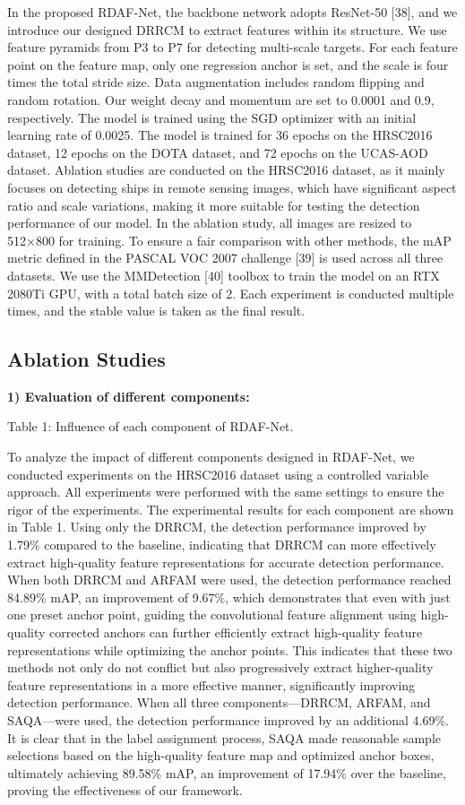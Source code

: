 \documentclass[journal]{IEEEtran}
\begin{document}
In the proposed RDAF-Net, the backbone network adopts ResNet-50 [38], and we introduce our designed DRRCM to extract features within its structure. We use feature pyramids from P3 to P7 for detecting multi-scale targets. For each feature point on the feature map, only one regression anchor is set, and the scale is four times the total stride size. Data augmentation includes random flipping and random rotation. Our weight decay and momentum are set to 0.0001 and 0.9, respectively. The model is trained using the SGD optimizer with an initial learning rate of 0.0025. The model is trained for 36 epochs on the HRSC2016 dataset, 12 epochs on the DOTA dataset, and 72 epochs on the UCAS-AOD dataset. Ablation studies are conducted on the HRSC2016 dataset, as it mainly focuses on detecting ships in remote sensing images, which have significant aspect ratio and scale variations, making it more suitable for testing the detection performance of our model. In the ablation study, all images are resized to 512×800 for training. To ensure a fair comparison with other methods, the mAP metric defined in the PASCAL VOC 2007 challenge [39] is used across all three datasets. We use the MMDetection [40] toolbox to train the model on an RTX 2080Ti GPU, with a total batch size of 2. Each experiment is conducted multiple times, and the stable value is taken as the final result.

\subsection{ Ablation Studies }

\textbf{1) Evaluation of different components:}

Table 1: Influence of each component of RDAF-Net.

To analyze the impact of different components designed in RDAF-Net, we conducted experiments on the HRSC2016 dataset using a controlled variable approach. All experiments were performed with the same settings to ensure the rigor of the experiments. The experimental results for each component are shown in Table 1. Using only the DRRCM, the detection performance improved by 1.79\% compared to the baseline, indicating that DRRCM can more effectively extract high-quality feature representations for accurate detection performance. When both DRRCM and ARFAM were used, the detection performance reached 84.89\% mAP, an improvement of 9.67\%, which demonstrates that even with just one preset anchor point, guiding the convolutional feature alignment using high-quality corrected anchors can further efficiently extract high-quality feature representations while optimizing the anchor points. This indicates that these two methods not only do not conflict but also progressively extract higher-quality feature representations in a more effective manner, significantly improving detection performance. When all three components—DRRCM, ARFAM, and SAQA—were used, the detection performance improved by an additional 4.69\%. It is clear that in the label assignment process, SAQA made reasonable sample selections based on the high-quality feature map and optimized anchor boxes, ultimately achieving 89.58\% mAP, an improvement of 17.94\% over the baseline, proving the effectiveness of our framework.
\end{document}
